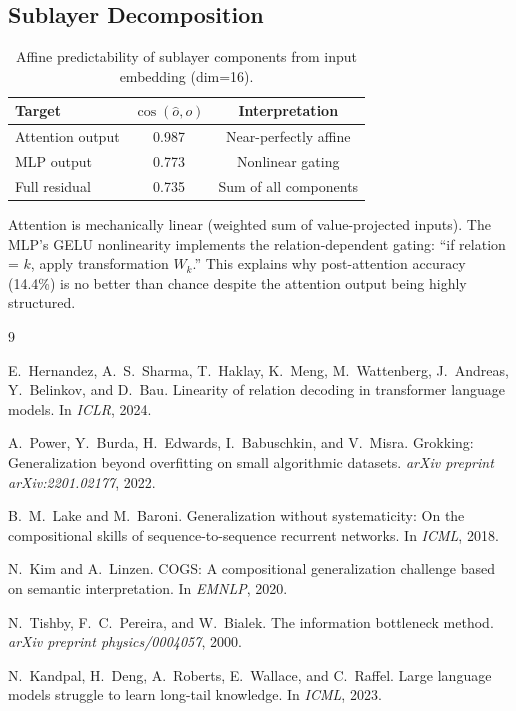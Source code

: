 \documentclass[11pt]{article}
\begin{document}
\subsection{Sublayer Decomposition}

\begin{table}[h]
\centering
\caption{Affine predictability of sublayer components from input embedding (dim=16).}
\begin{tabular}{lcc}
\toprule
Target & $\cos(\hat{o}, o)$ & Interpretation \\
\midrule
Attention output & 0.987 & Near-perfectly affine \\
MLP output & 0.773 & Nonlinear gating \\
Full residual & 0.735 & Sum of all components \\
\bottomrule
\end{tabular}
\end{table}

Attention is mechanically linear (weighted sum of value-projected inputs).  The MLP's
GELU nonlinearity implements the relation-dependent gating: ``if relation = $k$,
apply transformation $W_k$.''  This explains why post-attention accuracy (14.4\%)
is no better than chance despite the attention output being highly structured.

\begin{thebibliography}{9}

E.~Hernandez, A.~S.~Sharma, T.~Haklay, K.~Meng, M.~Wattenberg, J.~Andreas,
Y.~Belinkov, and D.~Bau.
\newblock Linearity of relation decoding in transformer language models.
\newblock In \emph{ICLR}, 2024.

A.~Power, Y.~Burda, H.~Edwards, I.~Babuschkin, and V.~Misra.
\newblock Grokking: Generalization beyond overfitting on small algorithmic datasets.
\newblock \emph{arXiv preprint arXiv:2201.02177}, 2022.

B.~M.~Lake and M.~Baroni.
\newblock Generalization without systematicity: On the compositional skills of
  sequence-to-sequence recurrent networks.
\newblock In \emph{ICML}, 2018.

N.~Kim and A.~Linzen.
\newblock COGS: A compositional generalization challenge based on semantic
  interpretation.
\newblock In \emph{EMNLP}, 2020.

N.~Tishby, F.~C.~Pereira, and W.~Bialek.
\newblock The information bottleneck method.
\newblock \emph{arXiv preprint physics/0004057}, 2000.

N.~Kandpal, H.~Deng, A.~Roberts, E.~Wallace, and C.~Raffel.
\newblock Large language models struggle to learn long-tail knowledge.
\newblock In \emph{ICML}, 2023.

\end{thebibliography}
\end{document}
